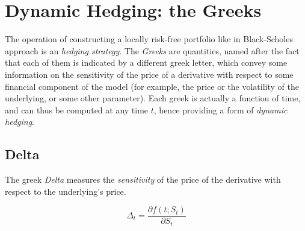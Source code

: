 \documentclass[oneside,titlepage,headinclude,12pt,a4paper,BCOR5mm,footinclude]{book}
\theoremstyle{defn}
\newcommand\de\partial
\begin{document}
\section{Dynamic Hedging: the Greeks}

The  operation   of  constructing   a  locally   risk-free  portfolio   like  in
Black-Scholes approach is an  \textit{hedging strategy}. The \textit{Greeks} are
quantities, named after the  fact that each of them is  indicated by a different
greek letter, which convey some information on the sensitivity of the price of a
derivative with respect  to some financial component of the  model (for example,
the price  or the volatility of  the underlying, or some  other parameter). Each
greek is actually a function of time, and  can thus be computed at any time $t$,
hence providing a form of \textit{dynamic hedging}.

\subsection{Delta}

The greek \textit{Delta}  measures the \textit{sensitivity} of the  price of the
derivative with respect to the underlying's price.

\[
  \Delta_t = \frac{\de f(t;S_t)}{\de S_t}
\]
\end{document}
